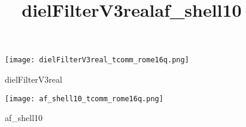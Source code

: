 \begin{figure}[H]
    \title{dielFilterV3real}
    \begin{center}
        \texttt{[image: dielFilterV3real\_tcomm\_rome16q.png]}
    \end{center}
    \caption{dielFilterV3real}
    \label{fig:dielFilterV3real_tcomm_rome16q.png}
\end{figure}

\begin{figure}[H]
    \title{af\_shell10}
    \begin{center}
        \texttt{[image: af\_shell10\_tcomm\_rome16q.png]}
    \end{center}
    \caption{af\_shell10}
    \label{fig:af_shell10_tcomm_rome16q.png}
\end{figure}






